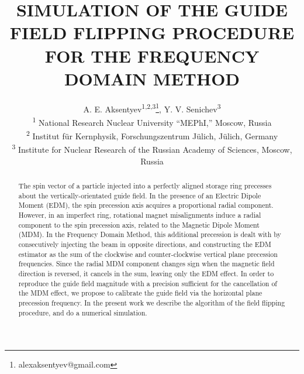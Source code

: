 \documentclass[a4paper]{jacow}
\begin{document}
\title{SIMULATION OF THE GUIDE FIELD FLIPPING PROCEDURE FOR THE FREQUENCY DOMAIN METHOD}
\author{A. E. Aksentyev\textsuperscript{1,2,3}\thanks{alexaksentyev@gmail.com},
  Y. V. Senichev\textsuperscript{3} \\
  \textsuperscript{1} National Research Nuclear University ``MEPhI,'' Moscow, Russia \\
  \textsuperscript{2} Institut f\"ur Kernphysik, Forschungszentrum J\"ulich, J\"ulich, Germany\\
  \textsuperscript{3} Institute for Nuclear Research of the Russian Academy of Sciences, Moscow, Russia}
\maketitle

\begin{abstract}
  The spin vector of a particle injected into a perfectly aligned storage ring precesses about
  the vertically-orientated guide field. In the presence of an Electric Dipole Moment (EDM),
  the spin precession axis acquires a proportional radial component.
  However, in an imperfect ring, rotational magnet misalignments induce a radial component
  to the spin precession axis, related to the Magnetic Dipole Moment (MDM). In the Frequency Domain Method,
  this additional precession is dealt with by consecutively injecting the beam in opposite directions,
  and constructing the EDM estimator as the sum of the clockwise and counter-clockwise
  vertical plane precession frequencies. Since the radial MDM component changes sign
  when the magnetic field direction is reversed, it cancels in the sum, leaving only the EDM effect. 
  In order to reproduce the guide field magnitude with a precision sufficient for
  the cancellation of the MDM effect, we propose to calibrate the guide field via
  the horizontal plane precession frequency. In the present work we describe the algorithm of
  the field flipping procedure, and do a numerical simulation.
\end{abstract}
\end{document}
